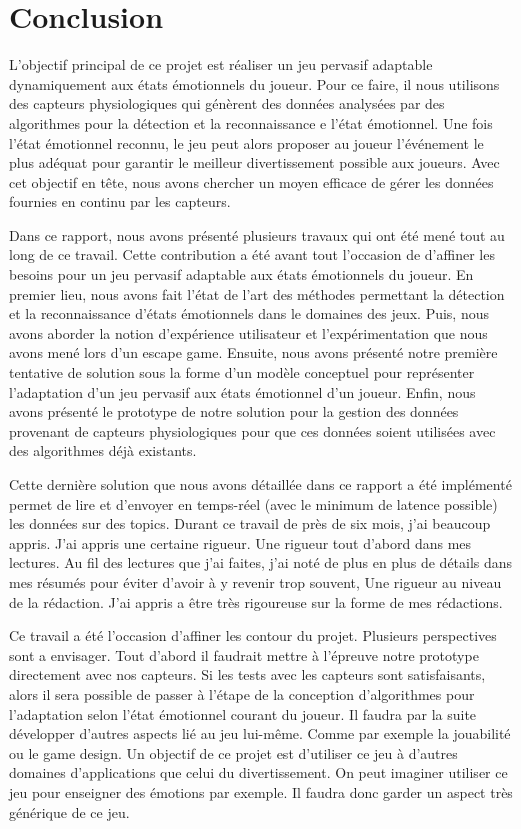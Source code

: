 \documentclass{article}
\begin{document}
\section{Conclusion}\label{sec:conclusion}
	L'objectif principal de ce projet est réaliser un jeu pervasif adaptable dynamiquement aux états émotionnels du joueur.
	Pour ce faire, il nous utilisons des capteurs physiologiques qui génèrent des données analysées par des algorithmes pour la détection et la reconnaissance e l'état émotionnel.
	Une fois l'état émotionnel reconnu, le jeu peut alors proposer au joueur l'événement le plus adéquat pour garantir le meilleur divertissement possible aux joueurs.
	Avec cet objectif en tête, nous avons chercher un moyen efficace de gérer les données fournies en continu par les capteurs.\par
	Dans ce rapport, nous avons présenté plusieurs travaux qui ont été mené tout au long de ce travail.
	Cette contribution a été avant tout l'occasion de d'affiner les besoins pour un jeu pervasif adaptable aux états émotionnels du joueur.
	En premier lieu, nous avons fait l'état de l'art des méthodes permettant la détection et la reconnaissance d'états émotionnels dans le domaines des jeux.
	Puis, nous avons aborder la notion d'expérience utilisateur et l'expérimentation que nous avons mené lors d'un escape game.
	Ensuite, nous avons présenté notre première tentative de solution sous la forme d'un modèle conceptuel pour représenter l'adaptation d'un jeu pervasif aux états émotionnel d'un joueur.
	Enfin, nous avons présenté le prototype de notre solution pour la gestion des données provenant de capteurs physiologiques pour que ces données soient utilisées avec des algorithmes déjà existants.\par
	Cette dernière solution que nous avons détaillée dans ce rapport a été implémenté permet de lire et d'envoyer en temps-réel (avec le minimum de latence possible) les données sur des topics.
	Durant ce travail de près de six mois, j'ai beaucoup appris.
	J'ai appris une certaine rigueur.
	Une rigueur tout d'abord dans mes lectures.
	Au fil des lectures que j'ai faites, j'ai noté de plus en plus de détails dans mes résumés pour éviter d'avoir à y revenir trop souvent,
	Une rigueur au niveau de la rédaction.
	J'ai appris a être très rigoureuse sur la forme de mes rédactions.\par
	Ce travail a été l'occasion d'affiner les contour du projet.
	Plusieurs perspectives sont a envisager.
	Tout d'abord il faudrait mettre à l'épreuve notre prototype directement avec nos capteurs.
	Si les tests avec les capteurs sont satisfaisants, alors il sera possible de passer à l'étape de la conception d'algorithmes pour l'adaptation selon l'état émotionnel courant du joueur.
	Il faudra par la suite développer d'autres aspects lié au jeu lui-même.
	Comme par exemple la jouabilité ou le game design.
	Un objectif de ce projet est d'utiliser ce jeu à d'autres domaines d'applications que celui du divertissement.
	On peut imaginer utiliser ce jeu pour enseigner des émotions par exemple.
	Il faudra donc garder un aspect très générique de ce jeu.
\end{document}
